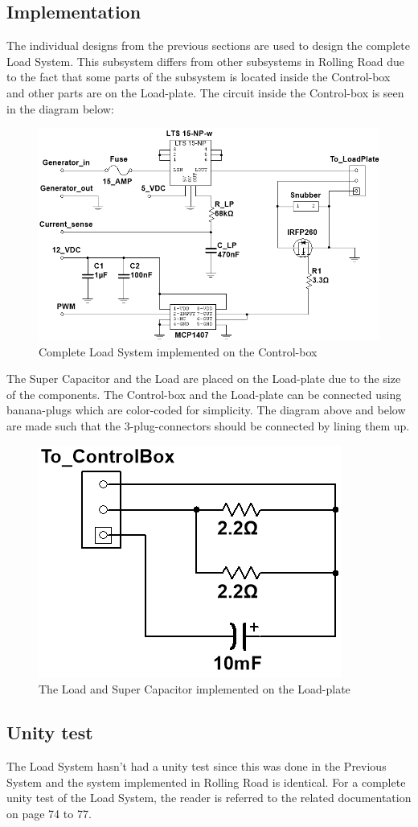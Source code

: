 






\subsection{Implementation}
The individual designs from the previous sections are used to design the complete Load System. This subsystem differs from other subsystems in Rolling Road due to the fact that some parts of the subsystem is located inside the Control-box and other parts are on the Load-plate. The circuit inside the Control-box is seen in the diagram below:

\begin{figure}[H]
	\centering
	\includegraphics[width=1\linewidth]{Hardware/LoadSystem/LoadSystem}
	\caption{Complete Load System implemented on the Control-box}
	\label{fig:LoadSystemCircuit}
\end{figure}

The Super Capacitor and the Load are placed on the Load-plate due to the size of the components. The Control-box and the Load-plate can be connected using banana-plugs which are color-coded for simplicity. The diagram above and below are made such that the 3-plug-connectors should be connected by lining them up.

\begin{figure}[H]
	\centering
	\includegraphics[width=0.35\linewidth]{Hardware/LoadSystem/LoadPlate}
	\caption{The Load and Super Capacitor implemented on the Load-plate}
	\label{fig:LoadPlateCircuit}
\end{figure}

\subsection{Unity test}
The Load System hasn't had a unity test since this was done in the Previous System\cite{BAC_rullefelt} and the system implemented in Rolling Road is identical. For a complete unity test of the Load System, the reader is referred to the related documentation on page 74 to 77.